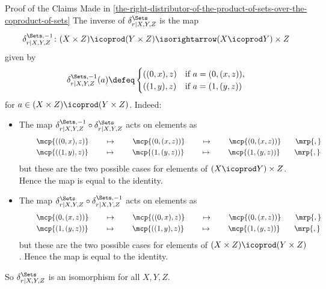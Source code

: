 \begin{Proof}{Proof of the Claims Made in \cref{the-right-distributor-of-the-product-of-sets-over-the-coproduct-of-sets}}%
    The inverse of $\delta^{\Sets}_{r|X,Y,Z}$ is the map
    \[%
        \delta^{\Sets,-1}_{r|X,Y,Z}%
        \colon%
        (X\times Z)\icoprod(Y\times Z)
        \isorightarrow
        (X\icoprod Y)\times Z%
    \]%
    given by
    \[%
        \delta^{\Sets,-1}_{r|X,Y,Z}(a)%
        \defeq%
        \begin{cases}
            ((0,x),z) &\text{if $a=(0,(x,z))$,}\\
            ((1,y),z) &\text{if $a=(1,(y,z))$}\
        \end{cases}
    \]%
    for $a\in (X\times Z)\icoprod(Y\times Z)$. Indeed:
    \begin{itemize}
      \item{}The map $\delta^{\Sets,-1}_{r|X,Y,Z} \circ \delta^{\Sets}_{r|X,Y,Z}$ acts on elements as
          \begin{align*}
              &\mkern40mu\mcp{((0,x),z)}\mkern40mu \mapsto \mkern40mu\mcp{(0,(x,z))}\mkern40mu \mapsto \mkern40mu\mcp{(0,(x,z))}\mkern35mu\mrp{,}\\
              &\mkern40mu\mcp{((1,y),z)}\mkern40mu \mapsto \mkern40mu\mcp{(1,(y,z))}\mkern40mu \mapsto \mkern40mu\mcp{(1,(y,z))}\mkern35mu\mrp{,}
          \end{align*}
          but these are the two possible cases for elements of $(X \icoprod Y) \times Z$. Hence the map is equal to the identity.
       \item\SloganFont{Invertibility \rmII. }The map $\delta^{\Sets}_{r|X,Y,Z} \circ \delta^{\Sets,-1}_{r|X,Y,Z}$ acts on elements as
           \begin{align*}
               &\mkern40mu\mcp{(0,(x,z))}\mkern40mu \mapsto \mkern40mu\mcp{((0,x),z)}\mkern40mu \mapsto \mkern40mu\mcp{(0,(x,z))}\mkern35mu\mrp{,}\\
               &\mkern40mu\mcp{(1,(y,z))}\mkern40mu \mapsto \mkern40mu\mcp{((1,y),z)}\mkern40mu \mapsto \mkern40mu\mcp{(1,(y,z))}\mkern35mu\mrp{,}
           \end{align*}
           but these are the two possible cases for elements of $(X \times Z) \icoprod (Y \times Z)$. Hence the map is equal to the identity.
    \end{itemize}
    So $\delta^{\Sets}_{r|X,Y,Z}$ is an isomorphism for all $X,Y,Z$.


\end{Proof}
